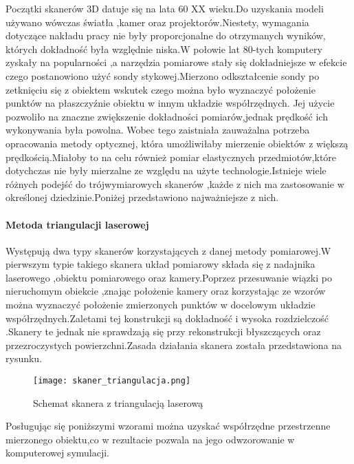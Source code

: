 \documentclass[12pt]{article}
\begin{document}
Początki skanerów 3D datuje się na lata 60 XX wieku.Do uzyskania modeli używano wówczas światła ,kamer oraz projektorów.Niestety, wymagania dotyczące nakładu pracy nie były proporcjonalne do otrzymanych wyników, których dokładność była względnie niska.W połowie lat 80-tych komputery zyskały na popularności ,a narzędzia pomiarowe stały się dokładniejsze w efekcie czego postanowiono użyć sondy stykowej.Mierzono odkształcenie sondy po zetknięciu się z obiektem wskutek czego można było wyznaczyć położenie punktów na płaszczyźnie obiektu w innym układzie współrzędnych. \cite{abdel20113d} Jej użycie pozwoliło na znaczne zwiększenie dokładności pomiarów,jednak prędkość ich wykonywania była powolna. Wobec tego zaistniała zauważalna potrzeba opracowania metody optycznej, która umożliwiłaby mierzenie obiektów z większą prędkością.Miałoby to na celu również pomiar elastycznych przedmiotów,które dotychczas nie były mierzalne ze względu na użyte technologie.Istnieje wiele różnych podejść do trójwymiarowych skanerów ,każde z nich ma zastosowanie w określonej dziedzinie.Poniżej przedstawiono najważniejsze z nich.

\paragraph{Metoda triangulacji laserowej\newline}
Występują dwa typy skanerów korzystających z danej metody pomiarowej.W pierwszym typie takiego skanera układ pomiarowy składa się z nadajnika laserowego ,obiektu pomiarowego oraz kamery.Poprzez przesuwanie wiązki po nieruchomym obiekcie ,znając położenie kamery oraz korzystając ze wzorów \cite{mikulski2013metody} można wyznaczyć położenie zmierzonych punktów w docelowym układzie współrzędnych.Zaletami tej konstrukcji są dokładność i wysoka rozdzielczość \cite{nowacki2018pomiar}.Skanery te jednak nie sprawdzają się przy rekonstrukcji błyszczących oraz przezroczystych powierzchni.Zasada działania skanera została przedstawiona na rysunku.

\begin{figure}[H]
  \centering
  \texttt{[image: skaner\_triangulacja.png]}
  \caption{Schemat skanera z triangulacją laserową \cite{mikulski2013metody}}   
  \label{fig:picture}
\end{figure}

Posługując się poniższymi wzorami można uzyskać współrzędne przestrzenne mierzonego obiektu,co w rezultacie pozwala na jego odwzorowanie w komputerowej symulacji.
\end{document}
